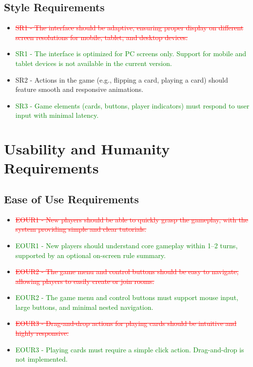 \documentclass[12pt]{article}
\newcommand{\removed}[1]{\textcolor{red}{\sout{#1}}}
\newcommand{\added}[1]{\textcolor{green}{#1}}
\begin{document}
\subsection{Style Requirements}
\begin{itemize}
    \item \removed{SR1 - The interface should be adaptive, ensuring proper display on different screen resolutions for mobile, tablet, and desktop devices.}
    \item \added{SR1 - The interface is optimized for PC screens only. Support for mobile and tablet devices is not available in the current version.}
    \item SR2 - Actions in the game (e.g., flipping a card, playing a card) should feature smooth and responsive animations.
    \item \added{SR3 - Game elements (cards, buttons, player indicators) must respond to user input with minimal latency.}
\end{itemize}

\section{Usability and Humanity Requirements}

\subsection{Ease of Use Requirements}
\begin{itemize}
    \item \removed{EOUR1 - New players should be able to quickly grasp the gameplay, with the system providing simple and clear tutorials.}
    \item \added{EOUR1 - New players should understand core gameplay within 1–2 turns, supported by an optional on-screen rule summary.}
    \item \removed{EOUR2 - The game menu and control buttons should be easy to navigate, allowing players to easily create or join rooms.}
    \item \added{EOUR2 - The game menu and control buttons must support mouse input, large buttons, and minimal nested navigation.}
    \item \removed{EOUR3 - Drag-and-drop actions for playing cards should be intuitive and highly responsive.}
    \item \added{EOUR3 - Playing cards must require a simple click action. Drag-and-drop is not implemented.}
\end{itemize}
\end{document}
